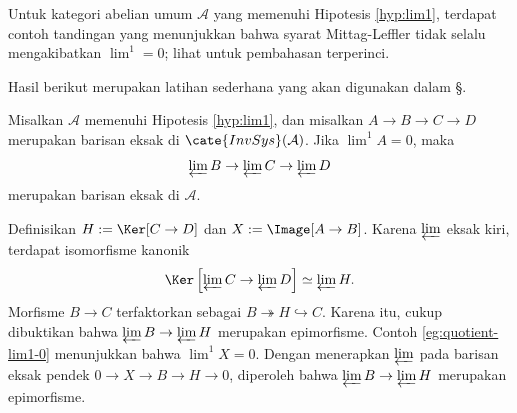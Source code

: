 Untuk kategori abelian umum $\mathcal{A}$ yang memenuhi Hipotesis
\ref{hyp:lim1}, terdapat contoh tandingan yang menunjukkan bahwa syarat
Mittag-Leffler tidak selalu mengakibatkan $\lim^1 = 0$; lihat
\cite{Roo06} untuk pembahasan terperinci.

Hasil berikut merupakan latihan sederhana yang akan digunakan dalam
\S{}.

\begin{korolari}\label{prop:ML-4-terms}
Misalkan $\mathcal{A}$ memenuhi Hipotesis \ref{hyp:lim1}, dan misalkan
$A \to B \to C \to D$ merupakan barisan eksak di
$\cate{InvSys}(\mathcal{A})$. Jika $\lim^1 A = 0$, maka
\[ \varprojlim B \to \varprojlim C \to \varprojlim D \]
merupakan barisan eksak di $\mathcal{A}$.
\end{korolari}
\begin{bukti}
Definisikan $H := \Ker[C \to D]$ dan $X := \Image[A \to B]$. Karena
$\varprojlim$ eksak kiri, terdapat isomorfisme kanonik
\[ \Ker\left[ \varprojlim C \to \varprojlim D\right] \simeq \varprojlim H . \]
Morfisme $B \to C$ terfaktorkan sebagai
$B \twoheadrightarrow H \hookrightarrow C$. Karena itu, cukup dibuktikan bahwa
$\varprojlim B \to \varprojlim H$ merupakan epimorfisme. Contoh
\ref{eg:quotient-lim1-0} menunjukkan bahwa $\lim^1 X = 0$. Dengan
menerapkan $\varprojlim$ pada barisan eksak pendek
$0 \to X \to B \to H \to 0$, diperoleh bahwa
$\varprojlim B \to \varprojlim H$ merupakan epimorfisme.
\end{bukti}
